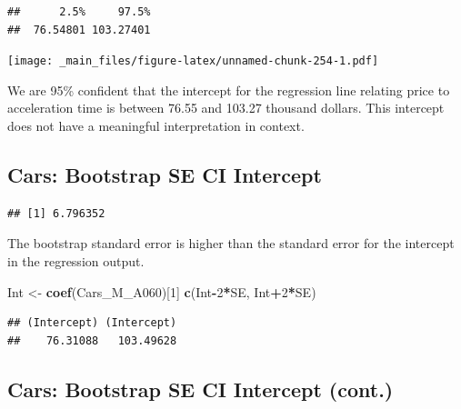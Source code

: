 \documentclass[]{book}
\newenvironment{Shaded}{\begin{snugshade}}{\end{snugshade}}
\newcommand{\KeywordTok}[1]{\textcolor[rgb]{0.13,0.29,0.53}{\textbf{#1}}}
\newcommand{\DecValTok}[1]{\textcolor[rgb]{0.00,0.00,0.81}{#1}}
\newcommand{\StringTok}[1]{\textcolor[rgb]{0.31,0.60,0.02}{#1}}
\newcommand{\OperatorTok}[1]{\textcolor[rgb]{0.81,0.36,0.00}{\textbf{#1}}}
\newcommand{\NormalTok}[1]{#1}
\begin{document}
\begin{verbatim}
##      2.5%     97.5% 
##  76.54801 103.27401
\end{verbatim}

\texttt{[image: \_main\_files/figure-latex/unnamed-chunk-254-1.pdf]}

We are 95\% confident that the intercept for the regression line
relating price to acceleration time is between 76.55 and 103.27 thousand
dollars. This intercept does not have a meaningful interpretation in
context.

\subsection{Cars: Bootstrap SE CI
Intercept}\label{cars-bootstrap-se-ci-intercept}

\begin{Shaded}
\end{Shaded}

\begin{verbatim}
## [1] 6.796352
\end{verbatim}

The bootstrap standard error is higher than the standard error for the
intercept in the regression output.

\begin{Shaded}
\begin{Highlighting}[]
\NormalTok{Int <-}\StringTok{ }\KeywordTok{coef}\NormalTok{(Cars_M_A060)[}\DecValTok{1}\NormalTok{]}
\KeywordTok{c}\NormalTok{(Int}\OperatorTok{-}\DecValTok{2}\OperatorTok{*}\NormalTok{SE, Int}\OperatorTok{+}\DecValTok{2}\OperatorTok{*}\NormalTok{SE)}
\end{Highlighting}
\end{Shaded}

\begin{verbatim}
## (Intercept) (Intercept) 
##    76.31088   103.49628
\end{verbatim}

\subsection{Cars: Bootstrap SE CI Intercept
(cont.)}\label{cars-bootstrap-se-ci-intercept-cont.}
\end{document}
